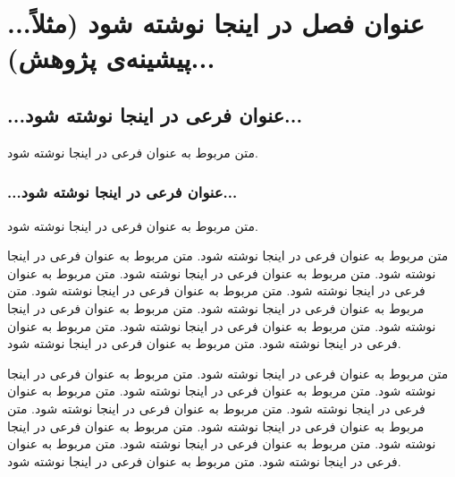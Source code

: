 \chapter{...عنوان فصل در اینجا نوشته شود  (مثلاً پیشینه‌ی پژوهش)...}

\section{...عنوان فرعی در اینجا نوشته شود...}
متن مربوط به عنوان فرعی در اینجا نوشته شود.

\subsection{...عنوان فرعی در اینجا نوشته شود...}
متن مربوط به عنوان فرعی در اینجا نوشته شود.

\newpage
متن مربوط به عنوان فرعی در اینجا نوشته شود.
متن مربوط به عنوان فرعی در اینجا نوشته شود.
متن مربوط به عنوان فرعی در اینجا نوشته شود.
متن مربوط به عنوان فرعی در اینجا نوشته شود.
متن مربوط به عنوان فرعی در اینجا نوشته شود.
متن مربوط به عنوان فرعی در اینجا نوشته شود.
متن مربوط به عنوان فرعی در اینجا نوشته شود.
متن مربوط به عنوان فرعی در اینجا نوشته شود.
متن مربوط به عنوان فرعی در اینجا نوشته شود.
متن مربوط به عنوان فرعی در اینجا نوشته شود.

\newpage
متن مربوط به عنوان فرعی در اینجا نوشته شود.
متن مربوط به عنوان فرعی در اینجا نوشته شود.
متن مربوط به عنوان فرعی در اینجا نوشته شود.
متن مربوط به عنوان فرعی در اینجا نوشته شود.
متن مربوط به عنوان فرعی در اینجا نوشته شود.
متن مربوط به عنوان فرعی در اینجا نوشته شود.
متن مربوط به عنوان فرعی در اینجا نوشته شود.
متن مربوط به عنوان فرعی در اینجا نوشته شود.
متن مربوط به عنوان فرعی در اینجا نوشته شود.
متن مربوط به عنوان فرعی در اینجا نوشته شود.